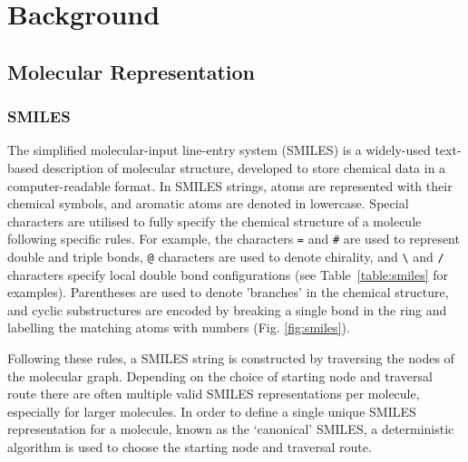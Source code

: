 \chapter{Background} \label{ch:background}

\section{Molecular Representation}

\subsection{SMILES}
The simplified molecular-input line-entry system (SMILES) \cite{Weininger1988, Weininger1989} is a widely-used text-based description of molecular structure, developed to store chemical data in a computer-readable format. In SMILES strings, atoms are represented with their chemical symbols, and aromatic atoms are denoted in lowercase. Special characters are utilised to fully specify the chemical structure of a molecule following specific rules. For example, the characters \texttt{=} and \texttt{\#} are used to represent double and triple bonds, \texttt{@} characters are used to denote chirality, and \texttt{\textbackslash} and \texttt{/} characters specify local double bond configurations (see Table~\ref{table:smiles} for examples). Parentheses are used to denote 'branches' in the chemical structure, and cyclic substructures are encoded by breaking a single bond in the ring and labelling the matching atoms with numbers (Fig. \ref{fig:smiles}).

Following these rules, a SMILES string is constructed by traversing the nodes of the molecular graph. Depending on the choice of starting node and traversal route there are often multiple valid SMILES representations per molecule, especially for larger molecules. In order to define a single unique SMILES representation for a molecule, known as the `canonical' SMILES, a deterministic algorithm is used to choose the starting node and traversal route. 


